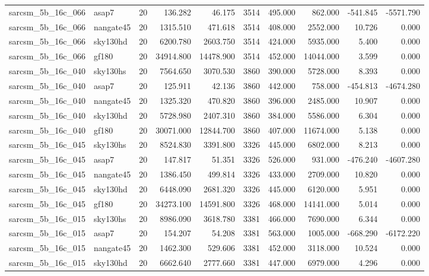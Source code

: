 \begin{tabular}{llrrrrrrrr}
sarcsm\_5b\_16c\_066 & asap7 & 20 & 136.282 & 46.175 & 3514 & 495.000 & 862.000 & -541.845 & -5571.790 \\
sarcsm\_5b\_16c\_066 & nangate45 & 20 & 1315.510 & 471.618 & 3514 & 408.000 & 2552.000 & 10.726 & 0.000 \\
sarcsm\_5b\_16c\_066 & sky130hd & 20 & 6200.780 & 2603.750 & 3514 & 424.000 & 5935.000 & 5.400 & 0.000 \\
sarcsm\_5b\_16c\_066 & gf180 & 20 & 34914.800 & 14478.900 & 3514 & 452.000 & 14044.000 & 3.599 & 0.000 \\
sarcsm\_5b\_16c\_040 & sky130hs & 20 & 7564.650 & 3070.530 & 3860 & 390.000 & 5728.000 & 8.393 & 0.000 \\
sarcsm\_5b\_16c\_040 & asap7 & 20 & 125.911 & 42.136 & 3860 & 442.000 & 758.000 & -454.813 & -4674.280 \\
sarcsm\_5b\_16c\_040 & nangate45 & 20 & 1325.320 & 470.820 & 3860 & 396.000 & 2485.000 & 10.907 & 0.000 \\
sarcsm\_5b\_16c\_040 & sky130hd & 20 & 5728.980 & 2407.310 & 3860 & 384.000 & 5586.000 & 6.304 & 0.000 \\
sarcsm\_5b\_16c\_040 & gf180 & 20 & 30071.000 & 12844.700 & 3860 & 407.000 & 11674.000 & 5.138 & 0.000 \\
sarcsm\_5b\_16c\_045 & sky130hs & 20 & 8524.830 & 3391.800 & 3326 & 445.000 & 6802.000 & 8.213 & 0.000 \\
sarcsm\_5b\_16c\_045 & asap7 & 20 & 147.817 & 51.351 & 3326 & 526.000 & 931.000 & -476.240 & -4607.280 \\
sarcsm\_5b\_16c\_045 & nangate45 & 20 & 1386.450 & 499.814 & 3326 & 433.000 & 2709.000 & 10.820 & 0.000 \\
sarcsm\_5b\_16c\_045 & sky130hd & 20 & 6448.090 & 2681.320 & 3326 & 445.000 & 6120.000 & 5.951 & 0.000 \\
sarcsm\_5b\_16c\_045 & gf180 & 20 & 34273.100 & 14591.800 & 3326 & 468.000 & 14141.000 & 5.014 & 0.000 \\
sarcsm\_5b\_16c\_015 & sky130hs & 20 & 8986.090 & 3618.780 & 3381 & 466.000 & 7690.000 & 6.344 & 0.000 \\
sarcsm\_5b\_16c\_015 & asap7 & 20 & 154.207 & 54.208 & 3381 & 563.000 & 1005.000 & -668.290 & -6172.220 \\
sarcsm\_5b\_16c\_015 & nangate45 & 20 & 1462.300 & 529.606 & 3381 & 452.000 & 3118.000 & 10.524 & 0.000 \\
sarcsm\_5b\_16c\_015 & sky130hd & 20 & 6662.640 & 2777.660 & 3381 & 447.000 & 6979.000 & 4.296 & 0.000 \\

\end{tabular}
